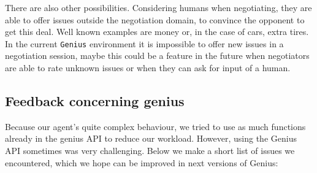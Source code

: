 There are also other possibilities. Considering humans when negotiating, they are able to offer issues outside the negotiation domain, to convince the opponent to get this deal. Well known examples are money or, in the case of cars, extra tires. In the current \texttt{Genius} environment it is impossible to offer new issues in a negotiation session, maybe this could be a feature in the future when negotiators are able to rate unknown issues or when they can ask for input of a human. 

\subsection{Feedback concerning genius}

Because our agent's quite complex behaviour, we tried to use as much functions
already in the genius API to reduce our workload. However, using the Genius API 
sometimes was very challenging. Below we make a short list of issues we encountered,
which we hope can be improved in next versions of Genius:

